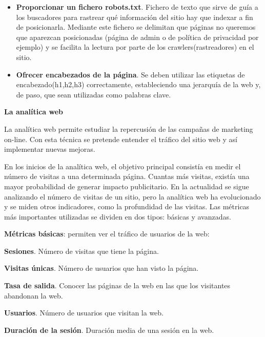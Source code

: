 \begin{itemize}
\item \textbf{Proporcionar un fichero robots.txt}. Fichero de texto que sirve de guía a los buscadores para rastrear  qué información del sitio hay que indexar a fin de posicionarla. Mediante este fichero se delimitan que páginas no queremos que aparezcan posicionadas (página de admin o de política de privacidad por ejemplo) y se facilita la lectura por parte de los crawlers(rastreadores) en el sitio.

\item \textbf{Ofrecer encabezados de la página}. Se deben utilizar las etiquetas de encabezado(h1,h2,h3) correctamente, estableciendo una jerarquía de la web y, de paso, que sean utilizadas como palabras clave.


\end{itemize}

\vspace{5 mm}

\textbf{La analítica web}

\vspace{5 mm}

La analítica web permite estudiar la repercusión de las campañas de marketing on-line. Con esta técnica se pretende entender el tráfico del sitio
web y así implementar nuevas mejoras.

\vspace{5 mm}

En los inicios de la analítica web, el objetivo principal consistía en medir el número de visitas a una determinada página. Cuantas más visitas,
existía una mayor probabilidad de generar impacto publicitario. En la actualidad se sigue analizando el número de visitas de un sitio, pero la analítica
web ha evolucionado y se miden otros indicadores, como la profundidad de las visitas. Las métricas más importantes utilizadas se dividen en dos tipos:
básicas y avanzadas.

\vspace{5 mm}

\textbf{Métricas básicas}: permiten ver el tráfico de usuarios de la web:

\begin{description}

\item \textbf{Sesiones}. Número de visitas que tiene la página.

\item \textbf{Visitas únicas}. Número de usuarios que han visto la página.

\item \textbf{Tasa de salida}. Conocer las páginas de la web en las que los visitantes abandonan la web.

\item \textbf{Usuarios}. Número de usuarios que visitan la web.

\item \textbf{Duración de la sesión}. Duración media de una sesión en la web.

\end{description}

